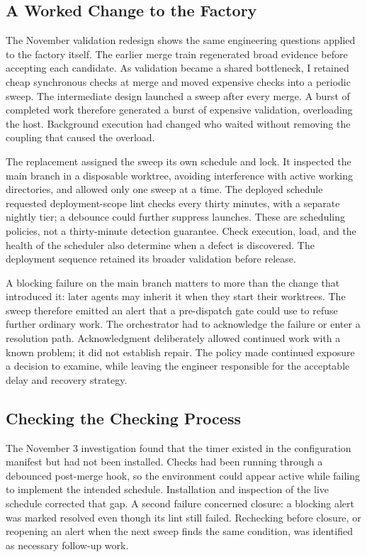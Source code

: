\subsection{A Worked Change to the Factory}\label{heading:a-worked-change-to-the-factory}

The November validation redesign shows the same engineering questions applied to the factory itself. The earlier merge train regenerated broad evidence before accepting each candidate. As validation became a shared bottleneck, I retained cheap synchronous checks at merge and moved expensive checks into a periodic sweep. The intermediate design launched a sweep after every merge. A burst of completed work therefore generated a burst of expensive validation, overloading the host. Background execution had changed who waited without removing the coupling that caused the overload.

The replacement assigned the sweep its own schedule and lock. It inspected the main branch in a disposable worktree, avoiding interference with active working directories, and allowed only one sweep at a time. The deployed schedule requested deployment-scope lint checks every thirty minutes, with a separate nightly tier; a debounce could further suppress launches. These are scheduling policies, not a thirty-minute detection guarantee. Check execution, load, and the health of the scheduler also determine when a defect is discovered. The deployment sequence retained its broader validation before release.

A blocking failure on the main branch matters to more than the change that introduced it: later agents may inherit it when they start their worktrees. The sweep therefore emitted an alert that a pre-dispatch gate could use to refuse further ordinary work. The orchestrator had to acknowledge the failure or enter a resolution path. Acknowledgment deliberately allowed continued work with a known problem; it did not establish repair. The policy made continued exposure a decision to examine, while leaving the engineer responsible for the acceptable delay and recovery strategy.

\subsection{Checking the Checking Process}\label{heading:checking-the-checking-process}

The November 3 investigation found that the timer existed in the configuration manifest but had not been installed. Checks had been running through a debounced post-merge hook, so the environment could appear active while failing to implement the intended schedule. Installation and inspection of the live schedule corrected that gap. A second failure concerned closure: a blocking alert was marked resolved even though its lint still failed. Rechecking before closure, or reopening an alert when the next sweep finds the same condition, was identified as necessary follow-up work.

